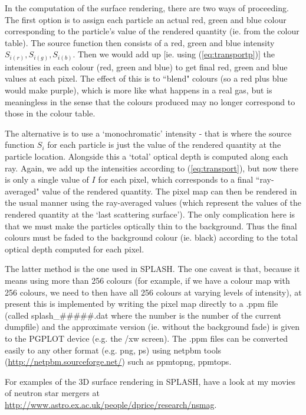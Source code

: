 \documentclass[a4paper,11pt]{article}
\begin{document}
 
 In the computation of the surface rendering, there are two ways of proceeding. The first option is to assign each
particle an actual red, green and blue colour corresponding to the particle's value of the rendered
quantity (ie. from the colour table). The source function then consists of a red, green and blue
intensity $S_{i(r)},S_{i(g)},S_{i(b)}$. Then we would add up [ie. using (\ref{eq:transportp})] the intensities in each colour (red, green and blue) to get final red, green and blue values at each pixel. The effect of this is to ``blend" colours (so a red plus blue would make
purple), which is more like what happens in a real gas, but is meaningless in the sense that the
colours produced may no longer correspond to those in the colour table.

 
 The alternative is to use a `monochromatic' intensity - that is where the source function $S_i$ for each
particle is just the value of the rendered quantity at the particle location. Alongside this a
`total' optical depth is computed along each ray. Again, we add up the
intensities according to (\ref{eq:transport}), but now there is only a single value of $I$ for each
pixel, which corresponds to a final ``ray-averaged" value of the rendered quantity. The pixel map can
then be rendered in the usual manner using the ray-averaged values (which represent the values of the
rendered quantity at the `last scattering surface'). The only complication here is that we must make
the particles optically thin to the background. Thus the final colours must be faded to the
background colour (ie. black) according to the total optical depth computed for each pixel.


 The latter method is the one used in SPLASH. The one caveat is that, because
it means using more than 256 colours (for example, if we have a colour map with 256 colours, we
need to then have all 256 colours at varying levels of intensity), at present this is implemented by
writing the pixel map directly to a .ppm file (called splash\_\#\#\#\#\#.dat where the number
is the number of the current dumpfile) and the approximate version (ie. without the background fade)
is given to the PGPLOT device (e.g. the /xw screen). The .ppm files can be converted easily to any
other format (e.g. png, ps) using netpbm tools (\url{http://netpbm.sourceforge.net/}) such as
ppmtopng, ppmtops.

 For examples of the 3D surface rendering in SPLASH, have a look at my movies of neutron star mergers at \url{http://www.astro.ex.ac.uk/people/dprice/research/nsmag}.
\end{document}
